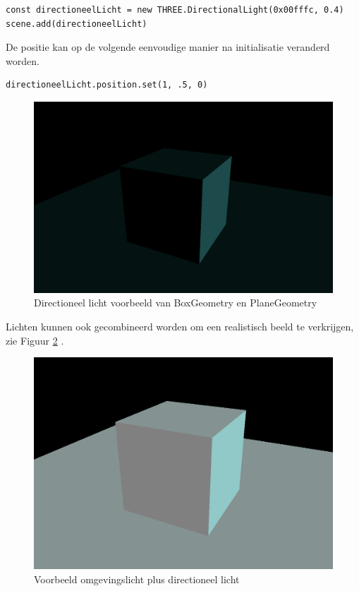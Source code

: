 \begin{lstlisting}
const directioneelLicht = new THREE.DirectionalLight(0x00fffc, 0.4)
scene.add(directioneelLicht)
\end{lstlisting}

De positie kan op de volgende eenvoudige manier na initialisatie veranderd worden.

\begin{lstlisting}
directioneelLicht.position.set(1, .5, 0)
\end{lstlisting}

\begin{figure}[h]
	\centering
	\includegraphics[width=.7\linewidth]{graphics/directionalLight}
	\caption[Directioneel licht voorbeeld van BoxGeometry en PlaneGeometry]{Directioneel licht voorbeeld van BoxGeometry en PlaneGeometry}
	\label{fig:directionalLight}
\end{figure}
\newpage
Lichten kunnen ook gecombineerd worden om een realistisch beeld te verkrijgen, zie Figuur  \ref{fig:ambientPlusDirectionalLight}  \autocite{Simon2023}.

\begin{figure}[h]
	\centering
	\includegraphics[width=.7\linewidth]{graphics/ambientPlusDirectionalLight}
	\caption[Voorbeeld omgevingslicht plus directioneel licht]{Voorbeeld omgevingslicht plus directioneel licht}
	\label{fig:ambientPlusDirectionalLight}
\end{figure}

